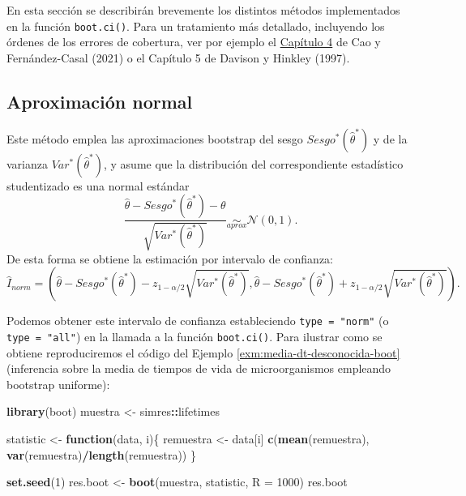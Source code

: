 \documentclass[
  spanish,
  10pt,
]{book}
\newenvironment{Shaded}{\begin{snugshade}}{\end{snugshade}}
\newcommand{\AttributeTok}[1]{\textcolor[rgb]{0.13,0.29,0.53}{#1}}
\newcommand{\ControlFlowTok}[1]{\textcolor[rgb]{0.13,0.29,0.53}{\textbf{#1}}}
\newcommand{\DecValTok}[1]{\textcolor[rgb]{0.00,0.00,0.81}{#1}}
\newcommand{\FunctionTok}[1]{\textcolor[rgb]{0.13,0.29,0.53}{\textbf{#1}}}
\newcommand{\NormalTok}[1]{#1}
\newcommand{\OtherTok}[1]{\textcolor[rgb]{0.56,0.35,0.01}{#1}}
\newcommand{\SpecialCharTok}[1]{\textcolor[rgb]{0.81,0.36,0.00}{\textbf{#1}}}
\theoremstyle{break}
\theoremstyle{nonumberplain}
\begin{document}
En esta sección se describirán brevemente los distintos métodos implementados en la función \texttt{boot.ci()}.
Para un tratamiento más detallado, incluyendo los órdenes de los errores de cobertura, ver por ejemplo el \href{https://rubenfcasal.github.io/book_remuestreo/icboot.html}{Capítulo 4} de Cao y Fernández-Casal (2021) o el Capítulo 5 de Davison y Hinkley (1997).

\subsection{Aproximación normal}\label{boot-ic-norm}

Este método emplea las aproximaciones bootstrap del sesgo \(Sesgo^{\ast}\left( \hat{\theta}^{\ast} \right)\) y de la varianza \(Var^{\ast}\left( \hat{\theta}^{\ast} \right)\), y asume que la distribución del correspondiente estadístico studentizado es una normal estándar
\[\frac{\hat{\theta} - Sesgo^{\ast}\left( \hat{\theta}^{\ast} \right) - \theta}{\sqrt{Var^{\ast}\left( \hat{\theta}^{\ast} \right)}} \underset{aprox}{\sim }\mathcal{N}\left( 0, 1 \right).\]
De esta forma se obtiene la estimación por intervalo de confianza:
\[\hat{I}_{norm}=\left( \hat{\theta} - Sesgo^{\ast}\left( \hat{\theta}^{\ast} \right) - z_{1-\alpha /2}\sqrt{Var^{\ast}\left( \hat{\theta}^{\ast} \right)},\hat{\theta} - Sesgo^{\ast}\left( \hat{\theta}^{\ast} \right) + z_{1 - \alpha /2}\sqrt{Var^{\ast}\left( \hat{\theta}^{\ast} \right)} \right).\]

Podemos obtener este intervalo de confianza estableciendo \texttt{type\ =\ "norm"} (o \texttt{type\ =\ "all"}) en la llamada a la función \texttt{boot.ci()}.
Para ilustrar como se obtiene reproduciremos el código del Ejemplo \ref{exm:media-dt-desconocida-boot} (inferencia sobre la media de tiempos de vida de microorganismos empleando bootstrap uniforme):

\begin{Shaded}
\begin{Highlighting}[]
\FunctionTok{library}\NormalTok{(boot)}
\NormalTok{muestra }\OtherTok{\textless{}{-}}\NormalTok{ simres}\SpecialCharTok{::}\NormalTok{lifetimes}

\NormalTok{statistic }\OtherTok{\textless{}{-}} \ControlFlowTok{function}\NormalTok{(data, i)\{}
\NormalTok{  remuestra }\OtherTok{\textless{}{-}}\NormalTok{ data[i]}
  \FunctionTok{c}\NormalTok{(}\FunctionTok{mean}\NormalTok{(remuestra), }\FunctionTok{var}\NormalTok{(remuestra)}\SpecialCharTok{/}\FunctionTok{length}\NormalTok{(remuestra))}
\NormalTok{\}}

\FunctionTok{set.seed}\NormalTok{(}\DecValTok{1}\NormalTok{)}
\NormalTok{res.boot }\OtherTok{\textless{}{-}} \FunctionTok{boot}\NormalTok{(muestra, statistic, }\AttributeTok{R =} \DecValTok{1000}\NormalTok{)}
\NormalTok{res.boot}
\end{Highlighting}
\end{Shaded}
\end{document}
